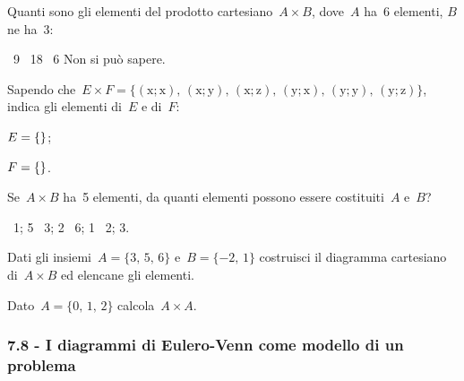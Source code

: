 \begin{esercizio}
 \label{ese:7.20}
Quanti sono gli elementi del prodotto cartesiano~$A\times B$, dove~$A$ ha~6 elementi, $B$ ne ha~3:
\begin{center}
 \boxA\quad~9 \quad\boxB\quad~18 \quad\boxC\quad~6 \quad\boxD\quad Non si può sapere.
\end{center}

\end{esercizio}


\begin{esercizio}
 \label{ese:7.21}
Sapendo che~$E\times F=\{(\text{x};\text{x})\text{, }(\text{x};\text{y})\text{, }(\text{x};\text{z})\text{, }(\text{y};\text{x})\text{, }(\text{y};\text{y})\text{, }(\text{y};\text{z})\}$, indica gli elementi di~$E$ e di~$F$:
\begin{multicols}{2}
\begin{enumeratea}
 \item $E=\{\dotfill\}$;
 \item $F=\{\dotfill\}$.
\end{enumeratea}
\end{multicols}
\end{esercizio}

\begin{esercizio}
 \label{ese:7.22}
Se~$A\times B$ ha~5 elementi, da quanti elementi possono essere costituiti~$A$ e~$B$?
\begin{center}
 \boxA\quad~1; 5 \quad\boxB\quad~3; 2 \quad\boxC\quad~6; 1 \quad\boxD\quad~2; 3.
\end{center}
\end{esercizio}

\begin{esercizio}
 \label{ese:7.23}
Dati gli insiemi~$A=\{\text{3, 5, 6}\}$ e~$B=\{-2\text{, }1\}$ costruisci il
diagramma cartesiano di~$A\times B$ ed elencane gli elementi.
\end{esercizio}

\begin{esercizio}
 \label{ese:7.24}
 Dato~$A=\{\text{0, 1, 2}\}$ calcola~$A\times A$.
\end{esercizio}

\subsubsection*{7.8 - I diagrammi di Eulero-Venn come modello di un problema}

